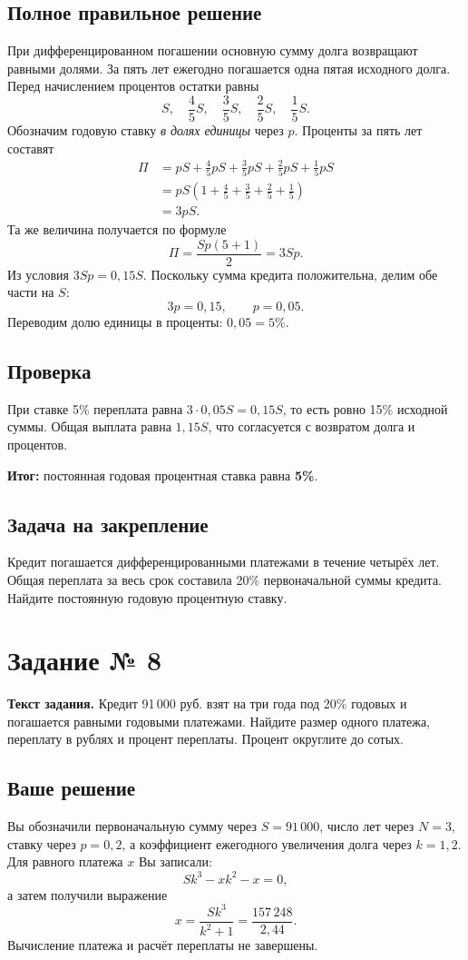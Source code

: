\documentclass[12pt,a4paper]{article}
\newcommand{\Result}{\textcolor{teal!60!black}{\textbf{Итог:}}}
\begin{document}
\subsection*{Полное правильное решение}
При дифференцированном погашении основную сумму долга возвращают равными долями. За пять лет ежегодно погашается одна пятая исходного долга. Перед начислением процентов остатки равны
\[
S,\quad \frac45S,\quad \frac35S,\quad \frac25S,\quad \frac15S.
\]
Обозначим годовую ставку \emph{в долях единицы} через $p$. Проценты за пять лет составят
\[
\begin{aligned}
\Pi
&=pS+\frac45pS+\frac35pS+\frac25pS+\frac15pS\\
&=pS\left(1+\frac45+\frac35+\frac25+\frac15\right)\\
&=3pS.
\end{aligned}
\]
Та же величина получается по формуле
\[
\Pi=\frac{Sp(5+1)}2=3Sp.
\]
Из условия $3Sp=0{,}15S$. Поскольку сумма кредита положительна, делим обе части на $S$:
\[
3p=0{,}15,\qquad p=0{,}05.
\]
Переводим долю единицы в проценты: $0{,}05=5\%$.

\subsection*{Проверка}
При ставке 5\% переплата равна $3\cdot0{,}05S=0{,}15S$, то есть ровно 15\% исходной суммы. Общая выплата равна $1{,}15S$, что согласуется с возвратом долга и процентов.

\Result{} постоянная годовая процентная ставка равна \textbf{5\%}.

\subsection*{Задача на закрепление}
Кредит погашается дифференцированными платежами в течение четырёх лет. Общая переплата за весь срок составила 20\% первоначальной суммы кредита. Найдите постоянную годовую процентную ставку.

\newpage
{}\label{task:8}
\section*{Задание № 8}
\textbf{Текст задания.} Кредит 91\,000 руб. взят на три года под 20\% годовых и погашается равными годовыми платежами. Найдите размер одного платежа, переплату в рублях и процент переплаты. Процент округлите до сотых.

\subsection*{Ваше решение}
Вы обозначили первоначальную сумму через $S=91\,000$, число лет через $N=3$, ставку через $p=0{,}2$, а коэффициент ежегодного увеличения долга через $k=1{,}2$. Для равного платежа $x$ Вы записали:
\[
Sk^3-xk^2-x=0,
\]
а затем получили выражение
\[
x=\frac{Sk^3}{k^2+1}
=\frac{157\,248}{2{,}44}.
\]
Вычисление платежа и расчёт переплаты не завершены.
\end{document}
